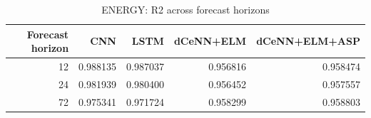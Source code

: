 \begin{table}
\caption{ENERGY: R2 across forecast horizons}
\begin{tabular}{rrrrr}
\toprule
Forecast horizon & CNN & LSTM & dCeNN+ELM & dCeNN+ELM+ASP \\
\midrule
12 & 0.988135 & 0.987037 & 0.956816 & 0.958474 \\
24 & 0.981939 & 0.980400 & 0.956452 & 0.957557 \\
72 & 0.975341 & 0.971724 & 0.958299 & 0.958803 \\
\bottomrule
\end{tabular}
\end{table}
